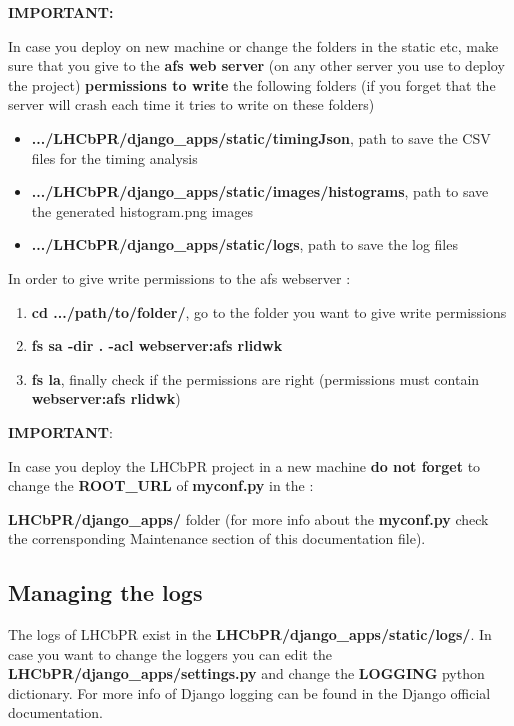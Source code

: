 \documentclass{lhcbnote}
\begin{document}
\vspace{2mm}

{\bf IMPORTANT:}

In case you deploy on new machine or change the folders in the static etc, make sure that you give to the {\bf afs web server} (on any other server you use to deploy the project) 
{\bf permissions to write} the following folders (if you forget that the server will crash each time it tries to write on these folders)

\begin{itemize}
\item
{\bf .../LHCbPR/django\_apps/static/timingJson}, path to save the CSV files for the timing analysis
\item
{\bf .../LHCbPR/django\_apps/static/images/histograms}, path to save the generated histogram.png images
\item
{\bf .../LHCbPR/django\_apps/static/logs}, path to save the log files
\end{itemize}

In order to give write permissions to the afs webserver :

\begin{enumerate}
\item
{\bf cd .../path/to/folder/}, go to the folder you want to give write permissions
\item
{\bf fs sa -dir . -acl  webserver:afs rlidwk}
\item
{\bf fs la}, finally check if the permissions are right (permissions must contain {\bf webserver:afs rlidwk})
\end{enumerate}

{\bf IMPORTANT}:

In case you deploy the LHCbPR project in a new machine {\bf do not forget} to change the {\bf ROOT\_URL} of {\bf myconf.py} in the :

{\bf LHCbPR/django\_apps/} folder (for more info about the {\bf myconf.py} check the corrensponding Maintenance section of this documentation file).

\subsection{Managing the logs}

The logs of LHCbPR exist in the {\bf LHCbPR/django\_apps/static/logs/}. In case you want to change the loggers
you can edit the {\bf LHCbPR/django\_apps/settings.py} and change the {\bf LOGGING} python dictionary. For more
info of Django logging can be found in the Django official documentation.
\end{document}
